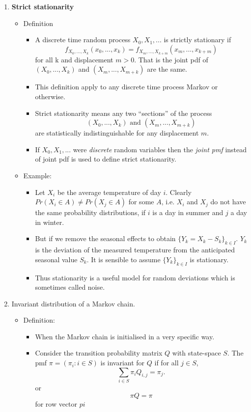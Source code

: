 \documentclass[12pt]{article}
\begin{document}
\begin{enumerate}
\item \textbf{Strict stationarity}
\begin{itemize}
\item Definition
\begin{itemize}
    \item A discrete time random process $X_0,X_1,...$ is strictly stationary if 
    \[
    f_{X_0,...,X_k}(x_0,...,x_k) = f_{X_m,...,X_{k+m}}(x_m,...,x_{k+m})
    \]
    for all k and displacement $m > 0$. That is the joint pdf of $(X_0,...,X_k)$ and $(X_m,...,X_{m+k})$ are the same. 
    \item This definition apply to any discrete time process Markov or otherwise.
    \item Strict stationarity means any two ``sections'' of the process 
    \[
    (X_0,...,X_k) \textrm{ and } (X_m,...,X_{m+k})
    \]
    are statistically indistinguishable for any displacement $m$. 
    \item If $X_0,X_1,...$ were \textit{discrete} random variables then the \textit{joint pmf} instead of joint pdf is used to define strict stationarity.
\end{itemize}
\item Example:
\begin{itemize}
    \item Let $X_i$ be the average temperature of day $i$. Clearly $Pr(X_i\in A) \not = Pr(X_j\in A)$ for some $A$, i.e. $X_i$ and $X_j$ do not have the same probability distributions, if $i$ is a day in summer and $j$ a day in winter.
    \item But if we remove the seasonal effects to obtain $\{ Y_k = X_k  - S_k\}_{k\in I}$. $Y_k$ is the deviation of the measured temperature from the anticipated seasonal value $S_k$. It is sensible to assume $\{ Y_k\}_{k\in I}$ is stationary.
    \item Thus stationarity is a useful model for random deviations which is sometimes called noise.
\end{itemize}
\end{itemize}
\item Invariant distribution of a Markov chain.
\begin{itemize}
    \item Definition:
    \begin{itemize}
        \item When the Markov chain is initialised in a very specific way.
        
        \item Consider the transition probability matrix $Q$ with state-space $S$. The pmf $\pi = (\pi_i : i\in S)$ is invariant for $Q$ if for all $j\in S$, 
        \[
        \sum_{i\in S} \pi_i Q_{i,j} = \pi_j .
        \]
        or
        \[
        \pi Q =\pi
        \]
        for row vector $pi$
    \end{itemize}
    

\end{itemize}
\end{enumerate}
\end{document}
